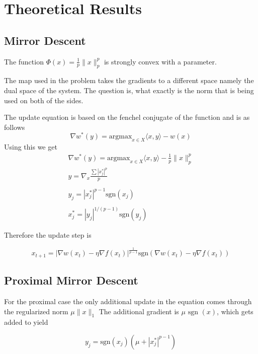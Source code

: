 \section*{Theoretical Results}

\subsection*{Mirror Descent}
The function $\Phi(x) = \frac{1}{p} \| x \|_p^p$ is strongly convex with a parameter.

The map used in the problem takes the gradients to a different space namely the dual space of the system. 
The question is, what exactly is the norm that is being used on both of the sides.

The update equation is based on the fenchel conjugate of the function and is as follows
\begin{equation}
    \nabla w^*(y) = \text{argmax}_{x \in X} \langle x, y \rangle - w(x)
\end{equation}
Using this we get 
\begin{gather*}
    \nabla w^*(y) = \text{argmax}_{x \in X} \langle x, y \rangle - \frac{1}{p} \| x \|_p^p 
    \\
    y = \nabla_x \frac{\sum |x^*_j|^p}{p} \\
    \\
    y_j = |x^*_j|^{p-1} \text{sgn}(x_j) \\
    \\
    x_j^* = |y_j|^{1/(p-1)} \text{sgn}(y_j)
\end{gather*}

Therefore the update step is 

\begin{equation}
\label{eq:mirror_descent}
    x_{t+1} =  | \nabla w(x_t) - \eta \nabla f(x_t) |^{\frac{1}{p-1}} \text{sgn}(\nabla w(x_t) - \eta \nabla f(x_t))
\end{equation}

\subsection*{Proximal Mirror Descent}

For the proximal case the only additional update in the equation comes through the regularized norm  $\mu \| x \|_1$
The additional gradient is $\mu \text{ sgn }(x)$, which gets added to yield 

$$
y_j = \text{sgn}(x_j) ( \mu +  |x_j^*|^{p-1} )
$$

